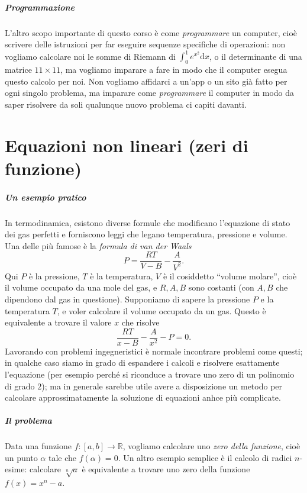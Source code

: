 \documentclass[a4paper]{report}
\theoremstyle{definiton}
\theoremstyle{remark}
\begin{document}
\paragraph{Programmazione} L'altro scopo importante di questo corso è come \emph{programmare} un computer, cioè scrivere delle istruzioni per far eseguire sequenze specifiche di operazioni: non vogliamo calcolare noi le somme di Riemann di $\int_0^1 e^{x^2} \mathrm{d}x$, o il determinante di una matrice $11\times 11$, ma vogliamo imparare a fare in modo che il computer esegua questo calcolo per noi. Non vogliamo affidarci a un'app o un sito già fatto per ogni singolo problema, ma imparare come \emph{programmare} il computer in modo da saper risolvere da soli qualunque nuovo problema ci capiti davanti.

\chapter{Equazioni non lineari (zeri di funzione)}

\paragraph{Un esempio pratico} In termodinamica, esistono diverse formule che modificano l'equazione di stato dei gas perfetti e forniscono leggi che legano temperatura, pressione e volume. Una delle più famose è la \emph{formula di van der Waals}
\[
    P = \frac{RT}{V-B} - \frac{A}{V^2}.
\]
Qui $P$ è la pressione, $T$ è la temperatura, $V$ è il cosiddetto ``volume molare'', cioè il volume occupato da una mole del gas, e $R,A,B$ sono costanti (con $A,B$ che dipendono dal gas in questione). Supponiamo di sapere la pressione $P$ e la temperatura $T$, e voler calcolare il volume occupato da un gas. Questo è equivalente a trovare il valore $x$ che risolve
\[
    \frac{RT}{x-B} - \frac{A}{x^2} - P = 0.
\]
Lavorando con problemi ingegneristici è normale incontrare problemi come questi; in qualche caso siamo in grado di espandere i calcoli e risolvere esattamente l'equazione (per esempio perché si riconduce a trovare uno zero di un polinomio di grado $2$); ma in generale sarebbe utile avere a disposizione un metodo per calcolare approssimatamente la soluzione di equazioni anhce più complicate.

\paragraph{Il problema} Data una funzione $f: [a,b] \to \mathbb{R}$, vogliamo calcolare uno \emph{zero della funzione}, cioè un punto $\alpha$ tale che $f(\alpha) = 0$. Un altro esempio semplice è il calcolo di radici $n$-esime: calcolare $\sqrt[n]{a}$ è equivalente a trovare uno zero della funzione $f(x) = x^n - a$.
\end{document}

